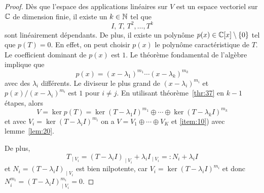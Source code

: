 \begin{proof}
  Dès que l'espace des applications linéaires sur $V$ est un espace vectoriel sur $\mathbb{C}$ de dimension finie, il existe un $k \in \mathbb{N}$ tel que 
  \begin{displaymath}
    I, \, T, \, T^2, \dots, T^k
  \end{displaymath}
sont linéairement dépendants. De plus, il existe un polynôme $p(x) \in \mathbb{C}[x] \setminus \{ 0 \}$ tel que $p(T) = 0$. En effet, on peut choisir $p(x)$ le polynôme 
caractéristique de $T$. Le coefficient dominant de $p(x)$ est $1$.   Le théorème fondamental de l'algèbre implique que 
\begin{displaymath}
  p(x) = ( x - λ_1)^{m_1} \cdots ( x - λ_k)^{m_k} 
\end{displaymath}
avec des $λ_i$ différents. 
Le diviseur le plus grand de $( x - λ_i)^{m_i}$ et $p(x) / ( x - λ_i)^{m_i}$ est $1$ pour $i ≠ j$. En utilisant théorème~\ref{thr:37} en $k-1$ étapes, alors 
\begin{displaymath} 
V =   \ker p(T) = \ker (T - λ_1I)^{m_1} ⊕  \cdots ⊕ \ker( T - λ_kI)^{m_k}
\end{displaymath}
et avec $V_i = \ker( T - λ_iI)^{m_i}$ on a $V = V_1 ⊕ \cdots ⊕ V_K$  et \ref{item:10}) avec lemme~\ref{lem:20}. \newline

De plus, $$T_{∣V_i} = (T - λ_iI)_{∣V_i} + λ_iI_{∣V_i} =\colon N_i + λ_iI$$ et $N_i = (T - λ_iI)_{∣V_i}$ est bien nilpotente, car $V_i = \ker( T - λ_iI)^{m_i}$ et donc $N_i^{m_i} = (T - λ_iI)^{m_i}_{∣V_i} = 0$.
\end{proof}



